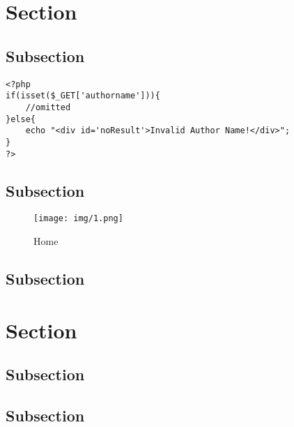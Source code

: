 \documentclass[a4paper]{article}
\begin{document}
    \tableofcontents
    \newpage
    \section{Section}
        \subsection{Subsection}
            \begin{verbatim}
<?php
if(isset($_GET['authorname'])){
    //omitted
}else{
    echo "<div id='noResult'>Invalid Author Name!</div>";
}
?>
            \end{verbatim}
        \subsection{Subsection}
            \begin{figure}[H]
            \centering
            \texttt{[image: img/1.png]}
            \caption{Home}
            \end{figure}
        \subsection{Subsection}
    \section{Section}
        \subsection{Subsection}
        \subsection{Subsection}
\end{document}

